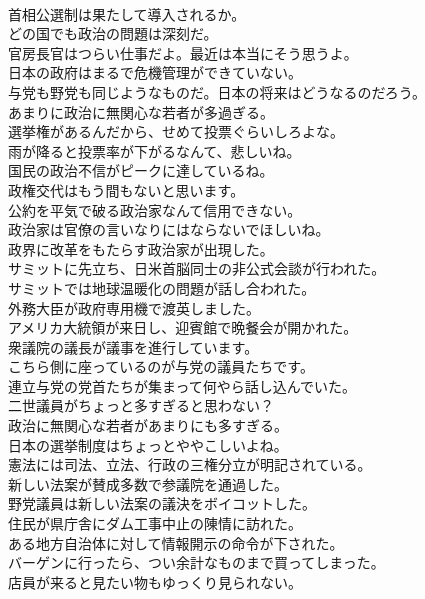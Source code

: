 \documentclass[8pt]{extreport}
\begin{document}
\begin{CJK}{UTF8}{min}
\\	首相公選制は果たして導入されるか。	
\\	どの国でも政治の問題は深刻だ。	
\\	官房長官はつらい仕事だよ。最近は本当にそう思うよ。	
\\	日本の政府はまるで危機管理ができていない。	
\\	与党も野党も同じようなものだ。日本の将来はどうなるのだろう。	
\\	あまりに政治に無関心な若者が多過ぎる。	
\\	選挙権があるんだから、せめて投票ぐらいしろよな。	
\\	雨が降ると投票率が下がるなんて、悲しいね。	
\\	国民の政治不信がピークに達しているね。	
\\	政権交代はもう間もないと思います。	
\\	公約を平気で破る政治家なんて信用できない。	
\\	政治家は官僚の言いなりにはならないでほしいね。	
\\	政界に改革をもたらす政治家が出現した。	
\\	サミットに先立ち、日米首脳同士の非公式会談が行われた。	
\\	サミットでは地球温暖化の問題が話し合われた。	
\\	外務大臣が政府専用機で渡英しました。	
\\	アメリカ大統領が来日し、迎賓館で晩餐会が開かれた。	
\\	衆議院の議長が議事を進行しています。	
\\	こちら側に座っているのが与党の議員たちです。	
\\	連立与党の党首たちが集まって何やら話し込んでいた。	
\\	二世議員がちょっと多すぎると思わない？	
\\	政治に無関心な若者があまりにも多すぎる。	
\\	日本の選挙制度はちょっとややこしいよね。	
\\	憲法には司法、立法、行政の三権分立が明記されている。	
\\	新しい法案が賛成多数で参議院を通過した。	
\\	野党議員は新しい法案の議決をボイコットした。	
\\	住民が県庁舎にダム工事中止の陳情に訪れた。	
\\	ある地方自治体に対して情報開示の命令が下された。	
\\	バーゲンに行ったら、つい余計なものまで買ってしまった。	
\\	店員が来ると見たい物もゆっくり見られない。	

\end{CJK}
\end{document}
